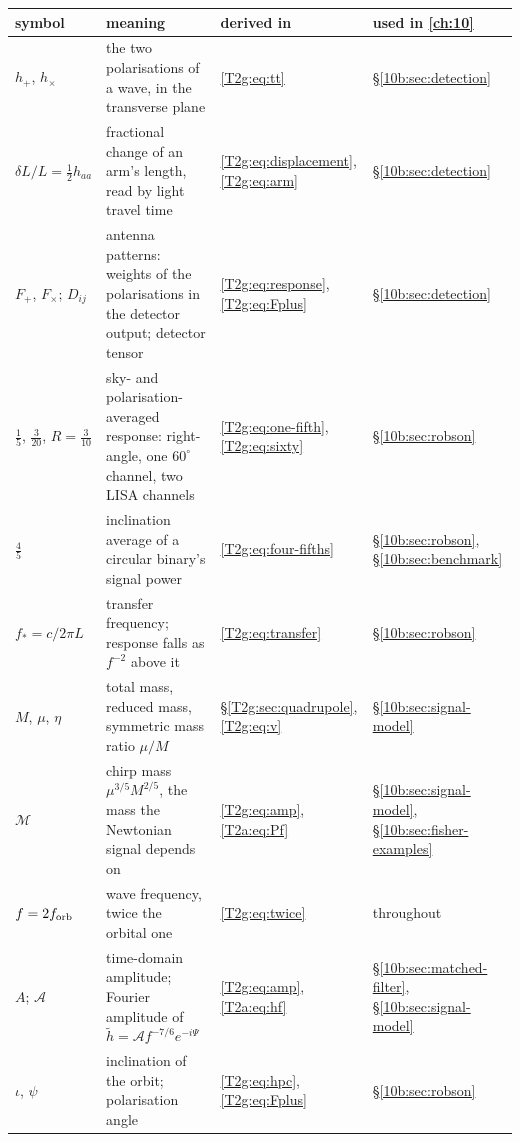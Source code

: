 \begin{table}[htbp]
\centering
\footnotesize
\renewcommand{\arraystretch}{1.18}
\begin{tabularx}{\linewidth}{@{}>{\raggedright\arraybackslash}p{2.35cm} >{\raggedright\arraybackslash}X >{\raggedright\arraybackslash}p{2.1cm} >{\raggedright\arraybackslash}p{2.5cm}@{}}
\toprule
symbol & meaning & derived in & used in \cref{ch:10} \\
\midrule
$h_+$, $h_\times$ & the two polarisations of a wave, in the transverse plane & \eqref{T2g:eq:tt} & \S\ref{10b:sec:detection} \\
$\delta L/L=\tfrac12h_{aa}$ & fractional change of an arm's length, read by light travel time & \eqref{T2g:eq:displacement}, \eqref{T2g:eq:arm} & \S\ref{10b:sec:detection} \\
$F_+$, $F_\times$; $D_{ij}$ & antenna patterns: weights of the polarisations in the detector output; detector tensor & \eqref{T2g:eq:response}, \eqref{T2g:eq:Fplus} & \S\ref{10b:sec:detection} \\
$\tfrac15$, $\tfrac3{20}$, $R=\tfrac3{10}$ & sky- and polarisation-averaged response: right-angle, one $60^\circ$ channel, two LISA channels & \eqref{T2g:eq:one-fifth}, \eqref{T2g:eq:sixty} & \S\ref{10b:sec:robson} \\
$\tfrac45$ & inclination average of a circular binary's signal power & \eqref{T2g:eq:four-fifths} & \S\ref{10b:sec:robson}, \S\ref{10b:sec:benchmark} \\
$f_*=c/2\pi L$ & transfer frequency; response falls as $f^{-2}$ above it & \eqref{T2g:eq:transfer} & \S\ref{10b:sec:robson} \\
$M$, $\mu$, $\eta$ & total mass, reduced mass, symmetric mass ratio $\mu/M$ & \S\ref{T2g:sec:quadrupole}, \eqref{T2g:eq:v} & \S\ref{10b:sec:signal-model} \\
$\mathcal M$ & chirp mass $\mu^{3/5}M^{2/5}$, the mass the Newtonian signal depends on & \eqref{T2g:eq:amp}, \eqref{T2a:eq:Pf} & \S\ref{10b:sec:signal-model}, \S\ref{10b:sec:fisher-examples} \\
$f=2f_{\rm orb}$ & wave frequency, twice the orbital one & \eqref{T2g:eq:twice} & throughout \\
$A$; $\mathcal A$ & time-domain amplitude; Fourier amplitude of $\tilde h=\mathcal Af^{-7/6}e^{-i\Psi}$ & \eqref{T2g:eq:amp}, \eqref{T2a:eq:hf} & \S\ref{10b:sec:matched-filter}, \S\ref{10b:sec:signal-model} \\
$\iota$, $\psi$ & inclination of the orbit; polarisation angle & \eqref{T2g:eq:hpc}, \eqref{T2g:eq:Fplus} & \S\ref{10b:sec:robson} \\

\end{tabularx}
\end{table}

